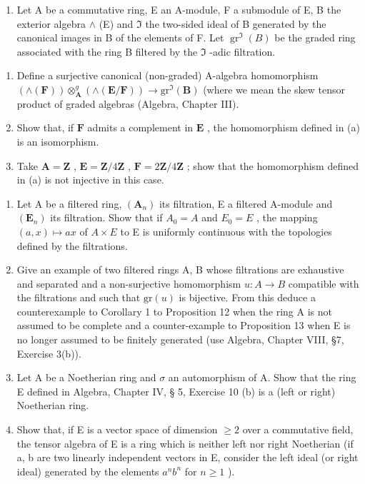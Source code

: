\begin{enumerate}
\def\labelenumi{\arabic{enumi}.}
\setcounter{enumi}{6}
\tightlist
\item
  Let A be a commutative ring, E an A-module, F a submodule of E, B the exterior algebra \(\wedge\) (E) and \(\Im\) the two-sided ideal of B generated by the canonical images in B of the elements of F. Let \(\operatorname{gr}^{\Im}(B)\) be the graded ring associated with the ring B filtered by the \(\Im\) -adic filtration.
\end{enumerate}

\begin{enumerate}
\def\labelenumi{(\alph{enumi})}
\item
   Define a surjective canonical (non-graded) A-algebra homomorphism \((\wedge (\mathbf{F})) \otimes_{\mathbf{A}}^{g}(\wedge (\mathbf{E} / \mathbf{F})) \to \mathrm{gr}^{\Im} (\mathbf{B})\) (where we mean the skew tensor product of graded algebras (Algebra, Chapter III).
\item
  Show that, if \(\mathbf{F}\) admits a complement in \(\mathbf{E}\) , the homomorphism defined in (a) is an isomorphism.
\item
   Take \(\mathbf{A} = \mathbf{Z}\) , \(\mathbf{E} = \mathbf{Z} / 4\mathbf{Z}\) , \(\mathbf{F} = 2\mathbf{Z} / 4\mathbf{Z}\) ; show that the homomorphism defined in (a) is not injective in this case.
\end{enumerate}

\begin{enumerate}
\def\labelenumi{\arabic{enumi}.}
\setcounter{enumi}{7}
\item
  Let A be a filtered ring, \((\mathbf{A}_{n})\) its filtration, E a filtered A-module and \((\mathbf{E}_{n})\) its filtration. Show that if \(A_{0} = A\) and \(E_{0} = E\) , the mapping \((a, x) \mapsto ax\) of \(A \times E\) to E is uniformly continuous with the topologies defined by the filtrations.
\item
  Give an example of two filtered rings A, B whose filtrations are exhaustive and separated and a non-surjective homomorphism \(u: A \to B\) compatible with the filtrations and such that \(\text{gr}(u)\) is bijective. From this deduce a counterexample to Corollary 1 to Proposition 12 when the ring A is not assumed to be complete and a counter-example to Proposition 13 when E is no longer assumed to be finitely generated (use Algebra, Chapter VIII, §7, Exercise 3(b)).
\item
  Let A be a Noetherian ring and \(\sigma\) an automorphism of A. Show that the ring E defined in Algebra, Chapter IV, § 5, Exercise 10 (b) is a (left or right) Noetherian ring.
\item
  Show that, if E is a vector space of dimension \(\geqslant2\) over a commutative field, the tensor algebra of E is a ring which is neither left nor right Noetherian (if a, b are two linearly independent vectors in E, consider the left ideal (or right ideal) generated by the elements \(a^{n}b^{n}\) for \(n\geqslant1\) ).
\end{enumerate}

